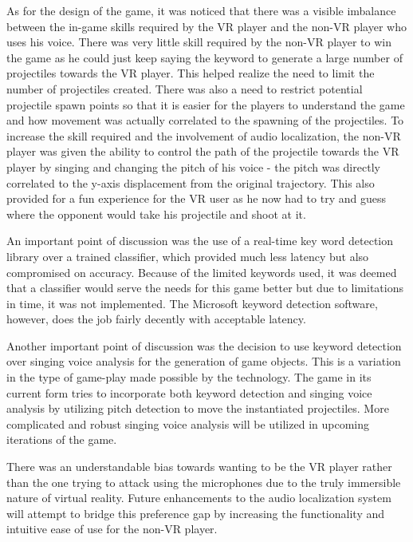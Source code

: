 \documentclass[convention]{aesconf}
\begin{document}
As for the design of the game, it was noticed that there was  a visible imbalance between the in-game skills required by the VR player and the non-VR player who uses his voice. There was very little skill required by the non-VR player to win the game as he could just keep saying the keyword to generate a large number of projectiles towards the VR player. This helped realize the need to limit the number of projectiles created. There was also a need to restrict potential projectile spawn points so that it is easier for the players to understand the game and how movement was actually correlated to the spawning of the projectiles. 
To increase the skill required and the involvement of audio localization, the non-VR player was given the ability to control the path of the projectile towards the VR player by singing and changing the pitch of his voice - the pitch was directly correlated to the y-axis displacement from the original trajectory. This also provided for a fun experience for the VR user as he now had to try and guess where the opponent would take his projectile and shoot at it. 

An important point of discussion was the use of a real-time key word detection library over a trained classifier, which provided much less latency but also compromised on accuracy. Because of the limited keywords used, it was deemed that a classifier would serve the needs for this game better but due to limitations in time, it was not implemented. The Microsoft keyword detection software, however, does the job fairly decently with acceptable latency.

Another important point of discussion was the decision to use keyword detection over singing voice analysis for the generation of game objects. This is a variation in the type of game-play made possible by the technology. The game in its current form tries to incorporate both keyword detection and singing voice analysis by utilizing pitch detection to move the instantiated projectiles. More complicated and robust singing voice analysis will be utilized in upcoming iterations of the game.

There was an understandable bias towards wanting to be the VR player rather than the one trying to attack using the microphones due to the truly immersible nature of virtual reality. Future enhancements to the audio localization system will attempt to bridge this preference gap by increasing the functionality and intuitive ease of use for the non-VR player.
\end{document}
